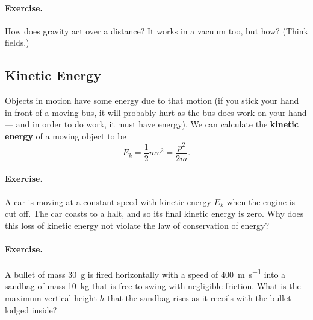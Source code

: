 \documentclass[a4paper]{amsbook}
\begin{document}
\paragraph{Exercise.} How does gravity act over a distance? It works in a vacuum too, but how? (Think fields.)

\subsection{Kinetic Energy}
Objects in motion have some energy due to that motion (if you stick your hand in front of a moving bus, it will probably
hurt as the bus does work on your hand --- and in order to do work, it must have energy). We can calculate the \textbf{kinetic energy}
of a moving object to be
\begin{equation}
  E_k = \frac{1}{2} mv^2 = \frac{p^2}{2m}.
\end{equation}

\paragraph{Exercise.} A car is moving at a constant speed with kinetic energy $ E_k $ when the engine is cut off. The car coasts to a halt,
and so its final kinetic energy is zero. Why does this loss of kinetic energy not violate the law of conservation of energy?

\paragraph{Exercise.} A bullet of mass \SI{30}{\gram} is fired horizontally with a speed of \SI{400}{\metre\per\second} into
a sandbag of mass \SI{10}{\kilo\gram} that is free to swing with negligible friction. What is the maximum vertical height $ h $
that the sandbag rises as it recoils with the bullet lodged inside?
\end{document}
